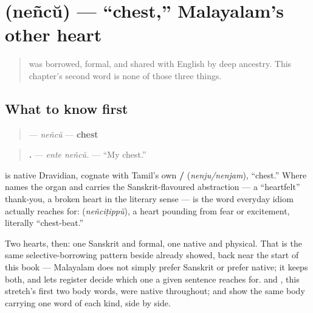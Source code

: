\section[\texorpdfstring{\ml{നെഞ്ച്} (neñcŭ)}{നെഞ്ച് (neñcŭ)}]{ (neñcŭ) — \textquotedblleft{}chest,\textquotedblright{} Malayalam's other heart}

\label{lesson:ML-C38-nenchu}



\begin{quote}
\textbf{} was borrowed, formal, and shared with English by deep ancestry. This chapter's second word is none of those three things.
\end{quote}

\subsection*{What to know first}
\begin{quote}
\textbf{} — \emph{neñcŭ} — \textbf{chest}
\end{quote}

\begin{quote}
\textbf{ .} — \emph{ente neñcŭ.} — \textquotedblleft{}My chest.\textquotedblright{}
\end{quote}

\begin{cousinweb}
\textbf{} is native Dravidian, cognate with Tamil's own \textbf{/} (\emph{nenju/nenjam}), \textquotedblleft{}chest.\textquotedblright{} Where \textbf{} names the organ and carries the Sanskrit-flavoured abstraction — a \textquotedblleft{}heartfelt\textquotedblright{} thank-you, a broken heart in the literary sense — \textbf{} is the word everyday idiom actually reaches for: \textbf{} (\emph{neñciṭippŭ}), a heart pounding from fear or excitement, literally \textquotedblleft{}chest-beat.\textquotedblright{}

Two hearts, then: one Sanskrit and formal, one native and physical. That is the same selective-borrowing pattern \textbf{} beside \textbf{} already showed, back near the start of this book — Malayalam does not simply prefer Sanskrit or prefer native; it keeps both, and lets register decide which one a given sentence reaches for. \textbf{} and \textbf{}, this stretch's first two body words, were native throughout; \textbf{} and \textbf{} show the same body carrying one word of each kind, side by side.
\end{cousinweb}

